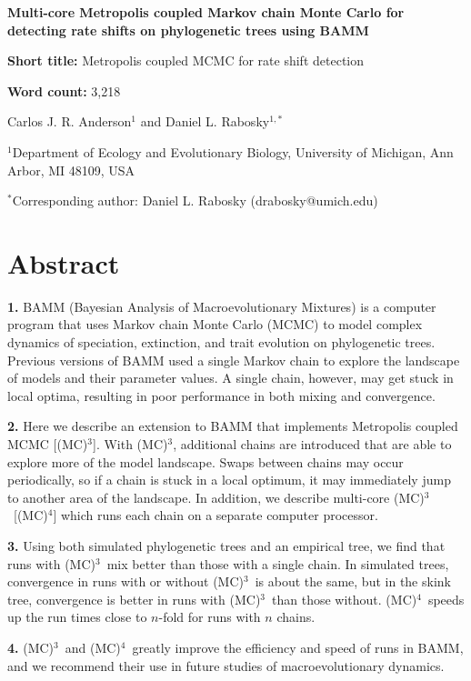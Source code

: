 \documentclass[12pt]{article}
\newcommand{\MCMCMC}{(MC)$^{3}$}
\newcommand{\MCMCMCMC}{(MC)$^{4}$}
\begin{document}
\baselineskip 24pt

\begin{flushleft}

{\Large\textbf{Multi-core Metropolis coupled Markov chain Monte Carlo
    for detecting rate shifts on phylogenetic trees using BAMM}}

\textbf{Short title:} Metropolis coupled MCMC for rate shift detection

\textbf{Word count:} 3,218

Carlos J. R. Anderson$^{1}$ and
Daniel L. Rabosky$^{1,*}$

$^{1}$Department of Ecology and Evolutionary Biology,
    University of Michigan, Ann Arbor, MI 48109, USA

$^{*}$Corresponding author: Daniel L. Rabosky (drabosky@umich.edu)

\end{flushleft}


\pagebreak[4]


\section*{Abstract}

{\setlength{\parindent}{0cm}

\textbf{1.}
BAMM (Bayesian Analysis of Macroevolutionary Mixtures) is a computer program
that uses Markov chain Monte Carlo (MCMC) to model complex dynamics
of speciation, extinction, and trait evolution on phylogenetic trees.
%
Previous versions of BAMM used a single Markov chain
to explore the landscape of models and their parameter values.
%
A single chain, however, may get stuck in local optima,
resulting in poor performance in both mixing and convergence.

\textbf{2.}
Here we describe an extension to BAMM
that implements Metropolis coupled MCMC [\MCMCMC].
%
With \MCMCMC, additional chains are introduced
that are able to explore more of the model landscape.
%
Swaps between chains may occur periodically,
so if a chain is stuck in a local optimum,
it may immediately jump to another area of the landscape.
%
In addition, we describe multi-core \MCMCMC\ [\MCMCMCMC]
which runs each chain on a separate computer processor.

\textbf{3.}
Using both simulated phylogenetic trees and an empirical tree,
we find that runs with \MCMCMC\ mix better than those with a single chain.
%
In simulated trees, convergence in runs with or without \MCMCMC\ 
is about the same, but in the skink tree,
convergence is better in runs with \MCMCMC\ than those without.
%
\MCMCMCMC\ speeds up the run times close to $n$-fold
for runs with $n$ chains.

\textbf{4.}
\MCMCMC\ and \MCMCMCMC\ greatly improve
the efficiency and speed of runs in BAMM,
and we recommend their use in future studies of macroevolutionary dynamics.
}
\end{document}
